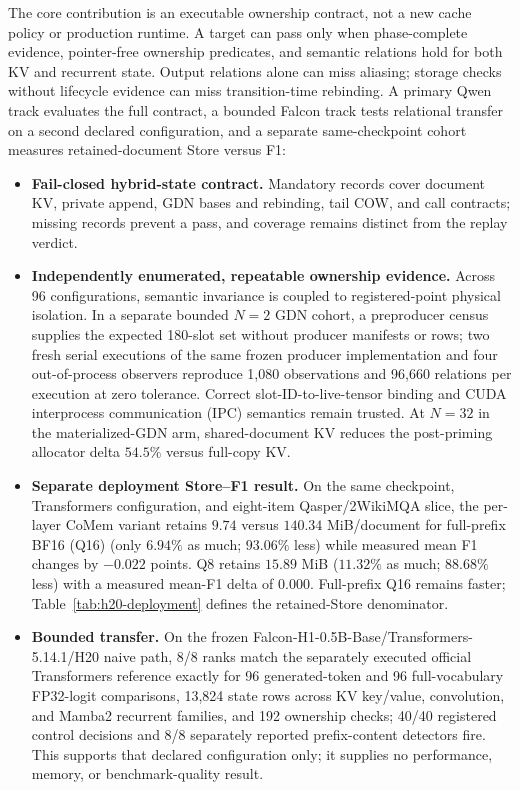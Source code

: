 \documentclass{article}
\begin{document}
The core contribution is an executable ownership contract, not a new cache
policy or production runtime.  A target can pass only when phase-complete
evidence, pointer-free ownership predicates, and semantic relations hold for
both KV and recurrent state.  Output relations alone can miss aliasing; storage
checks without lifecycle evidence can miss transition-time rebinding.  A
primary Qwen track evaluates the full contract, a bounded Falcon track tests
relational transfer on a second declared configuration, and a separate
same-checkpoint cohort measures retained-document Store versus F1:
\begin{itemize}
  \setlength{\itemsep}{1pt}
  \setlength{\parskip}{0pt}
  \item \textbf{Fail-closed hybrid-state contract.} Mandatory records cover
  document KV, private append, GDN bases and rebinding, tail COW, and call
  contracts; missing records prevent a pass, and coverage remains distinct
  from the replay verdict.
  \item \textbf{Independently enumerated, repeatable ownership evidence.}
  Across 96 configurations, semantic invariance is coupled to registered-point
  physical isolation.  In a separate bounded $N=2$ GDN cohort, a preproducer
  census supplies the expected 180-slot set without producer manifests or rows;
  two fresh serial executions of the same frozen producer implementation and
  four out-of-process observers reproduce 1,080 observations and 96,660
  relations per execution at zero tolerance.  Correct slot-ID-to-live-tensor
  binding and CUDA interprocess communication (IPC) semantics remain trusted.
  At $N=32$ in the materialized-GDN arm, shared-document KV
  reduces the post-priming allocator delta $54.5\%$ versus full-copy KV.
  \item \textbf{Separate deployment Store--F1 result.} On the same checkpoint,
  Transformers configuration, and eight-item Qasper/2WikiMQA slice, the per-layer CoMem
  variant retains $9.74$ versus $140.34$ MiB/document for full-prefix BF16
  (Q16)
  (only $6.94\%$ as much; $93.06\%$ less) while measured mean F1 changes by
  $-0.022$ points.  Q8 retains $15.89$ MiB ($11.32\%$ as much; $88.68\%$ less)
  with a measured mean-F1 delta of $0.000$.  Full-prefix Q16 remains faster;
  Table~\ref{tab:h20-deployment} defines the retained-Store denominator.
  \item \textbf{Bounded transfer.} On the frozen
  Falcon-H1-0.5B-Base/Transformers-5.14.1/H20 naive path, 8/8 ranks match the
  separately executed official Transformers reference
  exactly for 96 generated-token and 96 full-vocabulary FP32-logit comparisons,
  13,824 state rows across KV key/value, convolution, and Mamba2 recurrent
  families, and 192
  ownership checks; 40/40 registered control decisions and 8/8 separately
  reported prefix-content detectors fire.  This supports that declared
  configuration only; it supplies no performance, memory, or benchmark-quality
  result.
\end{itemize}
\end{document}

